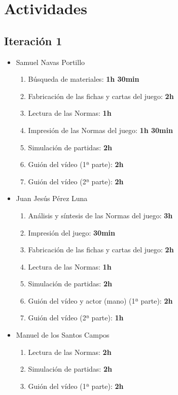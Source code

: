 \documentclass[11 pt]{book}
\begin{document}
	\section{Actividades}
	    \subsection*{Iteración 1}
		    \begin{itemize}
			    \item Samuel Navas Portillo
				    \begin{enumerate}
					    \item Búsqueda de materiales: \textbf{1h 30min}
					    \item Fabricación de las fichas y cartas del juego: \textbf{2h}
					    \item Lectura de las Normas: \textbf{1h}
					    \item Impresión de las Normas del juego: \textbf{1h 30min}
					    \item Simulación de partidas: \textbf{2h}
					    \item Guión del vídeo (1ª parte): \textbf{2h}
					    \item Guión del vídeo (2ª parte): \textbf{2h}
				    \end{enumerate}
			    \item Juan Jesús Pérez Luna
				    \begin{enumerate}
					    \item Análisis y síntesis de las Normas del juego: \textbf{3h}
					    \item Impresión del juego: \textbf{30min}
					    \item Fabricación de las fichas y cartas del juego: \textbf{2h}
					    \item Lectura de las Normas: \textbf{1h}
					    \item Simulación de partidas: \textbf{2h}
					    \item Guión del vídeo y actor (mano) (1ª parte): \textbf{2h}
					    \item Guión del vídeo (2ª parte): \textbf{1h}
				    \end{enumerate}
			    \item Manuel de los Santos Campos
				    \begin{enumerate}
					    \item Lectura de las Normas: \textbf{2h}
					    \item Simulación de partidas: \textbf{2h}
					    \item Guión del vídeo (1ª parte): \textbf{2h}

\end{enumerate}
\end{itemize}
\end{document}
